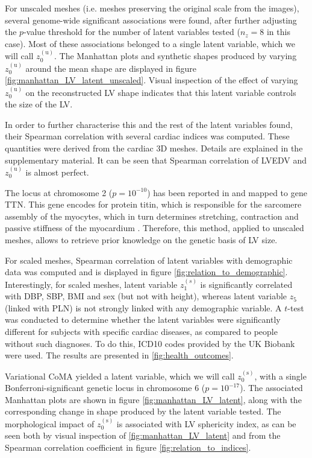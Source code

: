 For unscaled meshes (i.e. meshes preserving the original scale from the images), several genome-wide significant associations were found, after further adjusting the $p$-value threshold for the number of latent variables tested ($n_z=8$ in this case). Most of these associations belonged to a single latent variable, which we will call $z_0^{(\text{u})}$. The Manhattan plots and synthetic shapes produced by varying $z_0^{(\text{u})}$ around the mean shape are displayed in figure \ref{fig:manhattan_LV_latent_unscaled}. Visual inspection of the effect of varying $z_0^{(\text{u})}$ on the reconstructed LV shape indicates that this latent variable controls the size of the LV. 

In order to further characterise this and the rest of the latent variables found, their Spearman correlation with several cardiac indices was computed. These quantities were derived from the cardiac 3D meshes. Details are explained in the supplementary material. It can be seen that Spearman correlation of LVEDV and $z_0^{(\text{u})}$ is almost perfect.

The locus at chromosome 2 ($p=10^{-10}$) has been reported in  \cite{ref_nayaung, ref_pirruccello} and mapped to gene TTN. This gene encodes for protein titin, which is  responsible  for  the  sarcomere  assembly of the myocytes, which in turn determines stretching, contraction and passive stiffness of the myocardium \cite{granzier_giant_2004}. Therefore, this method, applied to unscaled meshes, allows to retrieve prior knowledge on the genetic basis of LV size.

For scaled meshes, Spearman correlation of latent variables with demographic data was computed and is displayed in figure \ref{fig:relation_to_demographic}.
Interestingly, for scaled meshes, latent variable $z_1^{(s)}$ is significantly correlated with DBP, SBP, BMI and sex (but not with height), whereas latent variable $z_5$ (linked with PLN) is not strongly linked with any demographic variable.
A $t$-test was conducted to determine whether the latent variables were significantly different for subjects with specific cardiac diseases, as compared to people without such diagnoses. To do this, ICD10 codes provided by the UK Biobank were used. The results are presented in \ref{fig:health_outcomes}.


Variational CoMA yielded a latent variable, which we will call $z_0^{(\text{s})}$, with a single Bonferroni-significant genetic locus in chromosome 6 ($p=10^{-17}$). The associated Manhattan plots are shown in figure \ref{fig:manhattan_LV_latent}, along with the corresponding change in shape produced by the latent variable tested. The morphological impact of $z_0^{(\text{s})}$ is associated with LV sphericity index, as can be seen both by visual inspection of \ref{fig:manhattan_LV_latent} and from the Spearman correlation coefficient in figure \ref{fig:relation_to_indices}.

